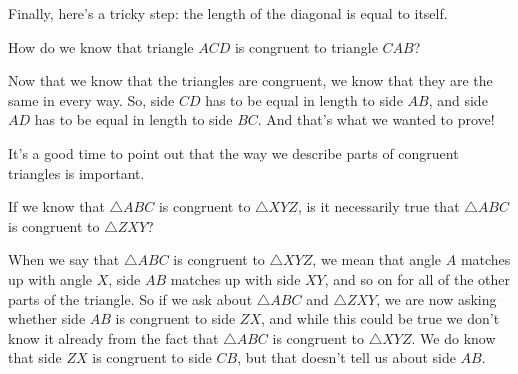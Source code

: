 \documentclass{ximera}
\begin{document}
\begin{example}
\begin{image}
\end{image}
Finally, here's a tricky step: the length of the diagonal is equal to itself.
\begin{question}
How do we know that triangle $ACD$ is congruent to triangle $CAB$?
\begin{multipleChoice}
\end{multipleChoice}
\end{question}
Now that we know that the triangles are congruent, we know that they are the same in every way. So, side $CD$ has to be equal in length to side $AB$, and side $AD$ has to be equal in length to side $BC$. And that's what we wanted to prove!

\end{example}

It's a good time to point out that the way we describe parts of congruent triangles is important.
\begin{question}
If we know that $\triangle ABC$ is congruent to $\triangle XYZ$, is it necessarily true that $\triangle ABC$ is congruent to $\triangle ZXY$?
\begin{multipleChoice}
\begin{feedback}[correct]
When we say that $\triangle ABC$ is congruent to $\triangle XYZ$, we mean that angle $A$ matches up with angle $X$, side $AB$ matches up with side $XY$, and so on for all of the other parts of the triangle. So if we ask about $\triangle ABC$ and $\triangle ZXY$, we are now asking whether side $AB$ is congruent to side $ZX$, and while this could be true we don't know it already from the fact that $\triangle ABC$ is congruent to $\triangle XYZ$. We do know that side $ZX$ is congruent to side $CB$, but that doesn't tell us about side $AB$.
\end{feedback}
\end{multipleChoice}
\end{question}
\end{document}

